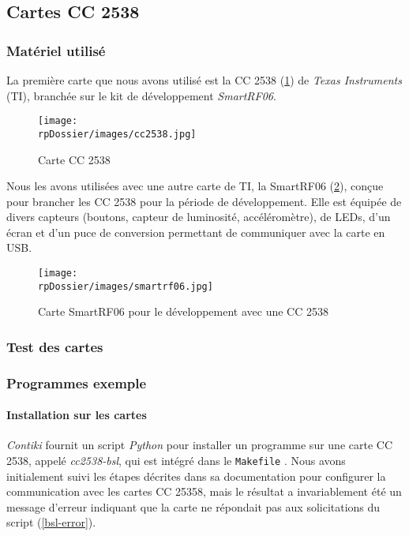 \subsection{Cartes CC 2538}

\subsubsection{Matériel utilisé}

La première carte que nous avons utilisé est la CC 2538 (\cref{cc2538}) de \emph{Texas Instruments} (TI), branchée sur le kit de développement \emph{SmartRF06}.

\begin{figure}[H]
\centering
\texttt{[image: \\rpDossier/images/cc2538.jpg]}
\caption{Carte CC 2538}
\label{cc2538}
\end{figure}

Nous les avons utilisées avec une autre carte de TI, la SmartRF06 (\cref{smartrf06}), conçue pour brancher les CC 2538 pour la période de développement.
Elle est équipée de divers capteurs (boutons, capteur de luminosité, accéléromètre), de LEDs, d’un écran et d’un puce de conversion permettant de communiquer avec la carte en USB.

\begin{figure}[H]
\centering
\texttt{[image: \\rpDossier/images/smartrf06.jpg]}
\caption{Carte SmartRF06 pour le développement avec une CC 2538}
\label{smartrf06}
\end{figure}

\subsubsection{Test des cartes}


\subsubsection{Programmes exemple}

\paragraph{Installation sur les cartes}

\emph{Contiki} fournit un script \emph{Python} pour installer un programme sur une carte CC 2538, appelé \emph{cc2538-bsl}, qui est intégré dans le \texttt{Makefile} .
Nous avons initialement suivi les étapes décrites dans sa documentation pour configurer la communication avec les cartes CC 25358, mais le résultat a invariablement été un message d’erreur indiquant que la carte ne répondait pas aux solicitations du script (\cref{bsl-error}).


